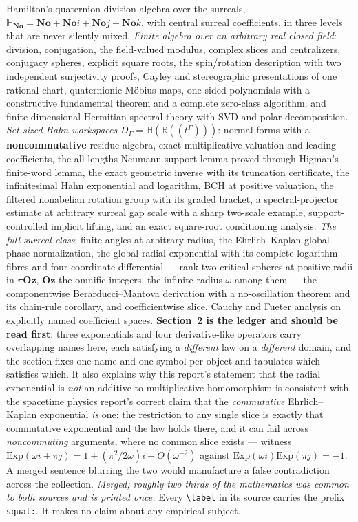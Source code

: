 \documentclass[11pt]{article}
\newcommand{\R}{\mathbb{R}}
\newcommand{\No}{\mathbf{No}}
\begin{document}
{Hamilton's quaternion division algebra over the surreals,
$\mathbb{H}_{\No}=\No+\No i+\No j+\No k$, with central surreal coefficients, in
three levels that are never silently mixed.  \emph{Finite algebra over an
arbitrary real closed field}: division, conjugation, the field-valued modulus,
complex slices and centralizers, conjugacy spheres, explicit square roots, the
spin/rotation description with two independent surjectivity proofs, Cayley and
stereographic presentations of one rational chart, quaternionic M\"obius maps, one-sided
polynomials with a constructive fundamental theorem and a complete zero-class
algorithm, and finite-dimensional Hermitian spectral theory with SVD and polar
decomposition.  \emph{Set-sized Hahn workspaces}
$D_\Gamma=\mathbb{H}(\R((t^\Gamma)))$: normal forms with a \textbf{noncommutative}
residue algebra, exact multiplicative valuation and leading coefficients, the
all-lengths Neumann support lemma proved through Higman's finite-word lemma, the
exact geometric inverse with its truncation certificate, the infinitesimal Hahn
exponential and logarithm, BCH at positive valuation, the filtered nonabelian
rotation group with its graded bracket, a spectral-projector estimate at
arbitrary surreal gap scale with a sharp two-scale example, support-controlled
implicit lifting, and an exact square-root conditioning analysis.  \emph{The
full surreal class}: finite angles at arbitrary radius, the Ehrlich--Kaplan
global phase normalization, the global radial exponential with its complete
logarithm fibres and four-coordinate differential --- rank-two critical spheres
at positive radii in $\pi\mathbf{Oz}$, $\mathbf{Oz}$ the omnific integers, the infinite
radius $\omega$ among them --- the
componentwise Berarducci--Mantova derivation with a no-oscillation theorem and
its chain-rule corollary, and coefficientwise slice, Cauchy and Fueter analysis
on explicitly named coefficient spaces.  \textbf{Section~2 is the ledger and
should be read first}: three exponentials and four derivative-like operators
carry overlapping names here, each satisfying a \emph{different} law on a
\emph{different} domain, and the section fixes one name and one symbol per
object and tabulates which satisfies which.  It also explains why this report's
statement that the radial exponential is \emph{not} an additive-to-multiplicative
homomorphism is consistent with the spacetime physics report's correct claim that the
\emph{commutative} Ehrlich--Kaplan exponential \emph{is} one: the restriction to
any single slice is exactly that commutative exponential and the law holds
there, and it can fail across \emph{noncommuting} arguments, where no common slice
exists --- witness $\mathrm{Exp}(\omega i+\pi j)=1+(\pi^2/2\omega)i+O(\omega^{-2})$
against $\mathrm{Exp}(\omega i)\mathrm{Exp}(\pi j)=-1$.  A merged sentence
blurring the two would manufacture a false contradiction across the collection.
\emph{Merged; roughly two thirds of the mathematics was common to both sources
and is printed once.}  Every \texttt{\textbackslash label} in its source carries
the prefix \texttt{squat:}.  It makes no claim about any empirical subject.}
\end{document}
